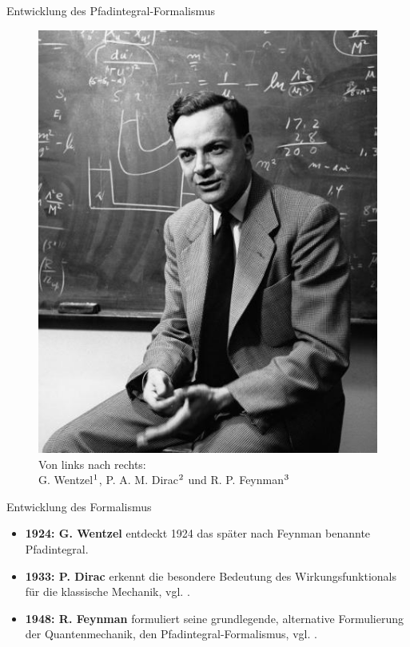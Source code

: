 \begin{frame}{Entwicklung des Pfadintegral-Formalismus}
\begin{figure}[H]
\begin{minipage}{0.335\textwidth}
	\includegraphics[width = \textwidth]{figures/feynman}	
	\end{minipage}
	
	\caption{Von links nach rechts: \\ \qquad \qquad \qquad \hspace{-3pt} G. Wentzel$\footnotemark$, P. A. M. Dirac$\footnotemark$ und R. P. Feynman$\footnotemark$}
\end{figure}
\end{frame}

\begin{frame}{Entwicklung des Formalismus}
	\begin{itemize}
		\item \textbf{1924: G. Wentzel} entdeckt 1924 das später nach Feynman benannte Pfadintegral. 
		\vfill 
		\item \textbf{1933: P. Dirac} erkennt die besondere Bedeutung des Wirkungsfunktionals für die klassische Mechanik, vgl. \cite{Dirac1934}.
		 \vfill 
		 \item \textbf{1948: R. Feynman} formuliert seine grundlegende, alternative Formulierung der Quantenmechanik, den Pfadintegral-Formalismus, vgl. \cite{Feynman1948}.
	\end{itemize}
\end{frame}